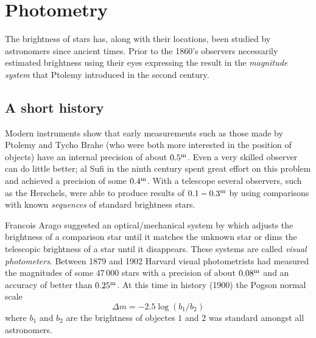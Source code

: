 %
\setcounter{count}{\value{enumi}}
\chapter{Photometry}

The brightness of stars has, along with their locations, been studied
by astronomers since ancient times. Prior to the 1860's observers
necessarily estimated brightness using their eyes expressing the
result in the {\it magnitude system} that Ptolemy introduced in the
second century. 

\section{A short history}

Modern instruments show that early measurements such as those made by
Ptolemy and Tycho Brahe (who were both more interested in the position
of objects) have an internal precision of about $0.5^{\rm m}$. Even a
very skilled observer can do little better; al Sufi in the ninth
century spent great effort on this problem and achieved a precision of
some $0.4^{\rm m}$. With a telescope several observers, such as the Herschels, were able to
produce results of $0.1-0.3^{\rm m}$ by using comparisons with known
{\it sequences} of standard brightness stars. 

Francois Arago suggested an optical/mechanical system by which adjusts
the brightness of a comparison star until it matches the unknown star
or dims the telescopic brightness of a star until it disappears. These
systems are called  {\it visual photometers}. Between 1879 and 1902
Harvard visual photometrists had measured the magnitudes of some
$47\,000$ stars with a precision of about $0.08^{\rm m}$ and an
accuracy of better than $0.25^{\rm m}$. At this time in history (1900)
the Pogson normal scale
\[
\Delta m=-2.5\log({b_1/b_2})
\]
where $b_1$ and $b_2$ are the brightness of objectes $1$ and $2$ was
standard amongst all astronomers. 

